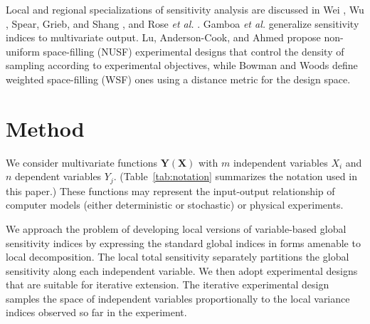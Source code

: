 \documentclass[12pt]{article}
\begin{document}
Local and regional specializations of sensitivity analysis are discussed in Wei \cite{wei_regional_2014}, Wu \cite{wu_application_2017}, Spear, Grieb, and Shang \cite{spear_parameter_1994}, and Rose \textit{et al.} \cite{rose_parameter_1991}. Gamboa \textit{et al.} \cite{gamboa_sensitivity_2013} generalize sensitivity indices to multivariate output. Lu, Anderson-Cook, and Ahmed \cite{lu_non-uniform_2020} propose non-uniform space-filling (NUSF) experimental designs that control the density of sampling according to experimental objectives, while Bowman and Woods \cite{bowman_weighted_2013} define weighted space-filling (WSF) ones using a distance metric for the design space.



\section{Method}
\label{sec:meth}

We consider multivariate functions $\mathbf{Y} \left( \mathbf{X} \right)$ with $m$ independent variables $X_i$ and $n$ dependent variables $Y_j$. (Table~\ref{tab:notation} summarizes the notation used in this paper.) These functions may represent the input-output relationship of computer models (either deterministic or stochastic) or physical experiments.

We approach the problem of developing local versions of variable-based global sensitivity indices by expressing the standard global indices \cite{saltelli_variance_2010} in forms amenable to local decomposition. The local total sensitivity separately partitions the global sensitivity along each independent variable. We then adopt experimental designs that are suitable for iterative extension. The iterative experimental design samples the space of independent variables proportionally to the local variance indices observed so far in the experiment.
\end{document}
